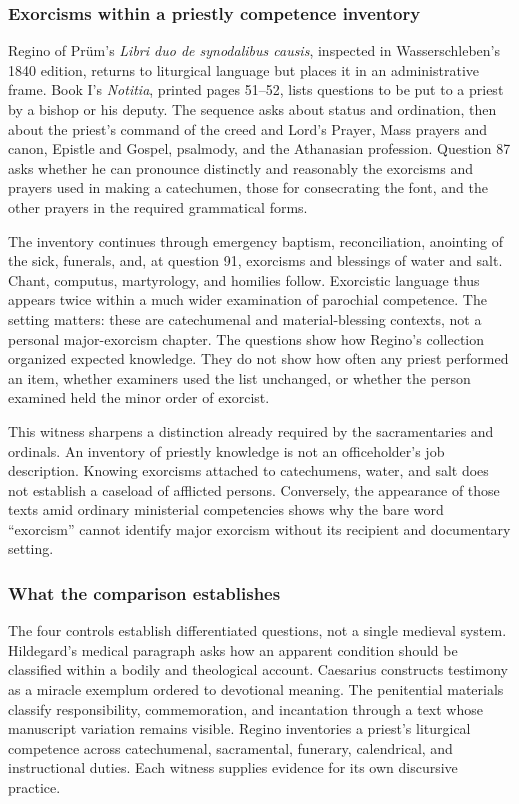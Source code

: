 \subsubsection{Exorcisms within a priestly competence inventory}

Regino of Prüm's \emph{Libri duo de synodalibus causis}, inspected in
Wasserschleben's 1840 edition, returns to liturgical language but places it in
an administrative frame. Book I's \emph{Notitia}, printed pages 51--52,
lists questions to be put to a priest by a bishop or his deputy. The sequence
asks about status and ordination, then about the priest's command of the creed
and Lord's Prayer, Mass prayers and canon, Epistle and Gospel, psalmody, and the
Athanasian profession. Question 87 asks whether he can pronounce distinctly
and reasonably the exorcisms and prayers used in making a catechumen, those
for consecrating the font, and the other prayers in the required grammatical
forms.

The inventory continues through emergency baptism, reconciliation, anointing
of the sick, funerals, and, at question 91, exorcisms and blessings of water
and salt. Chant, computus, martyrology, and homilies follow. Exorcistic language
thus appears twice within a much wider examination of parochial competence.
The setting matters: these are catechumenal and material-blessing contexts,
not a personal major-exorcism chapter. The questions show how Regino's
collection organized expected knowledge. They do not show how often any priest
performed an item, whether examiners used the list unchanged, or whether the
person examined held the minor order of exorcist.

This witness sharpens a distinction already required by the sacramentaries and
ordinals. An inventory of priestly knowledge is not an officeholder's job
description. Knowing exorcisms attached to catechumens, water, and salt does
not establish a caseload of afflicted persons. Conversely, the appearance of
those texts amid ordinary ministerial competencies shows why the bare word
``exorcism'' cannot identify major exorcism without its recipient and
documentary setting.

\subsubsection{What the comparison establishes}

The four controls establish differentiated questions, not a single medieval
system. Hildegard's medical paragraph asks how an apparent condition should be
classified within a bodily and theological account. Caesarius constructs
testimony as a miracle exemplum ordered to devotional meaning. The penitential
materials classify responsibility, commemoration, and incantation through a
text whose manuscript variation remains visible. Regino inventories a priest's
liturgical competence across catechumenal, sacramental, funerary, calendrical,
and instructional duties. Each witness supplies evidence for its own
discursive practice.

